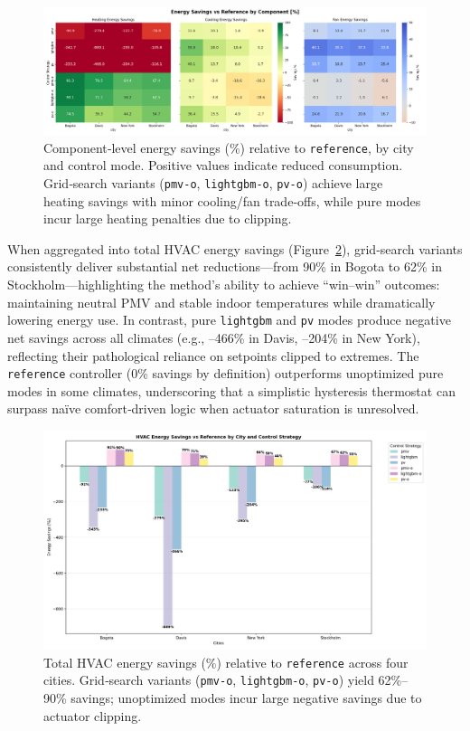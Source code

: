 \begin{figure}[h!]
    \centering
    \includegraphics[width=\linewidth]{figs/saving_end_pct.png}
    \caption{Component‐level energy savings (\%) relative to \texttt{reference}, by city and control mode. Positive values indicate reduced consumption. Grid‐search variants (\texttt{pmv-o}, \texttt{lightgbm-o}, \texttt{pv-o}) achieve large heating savings with minor cooling/fan trade‐offs, while pure modes incur large heating penalties due to clipping.}
    \label{fig:component_savings}
\end{figure}

When aggregated into total HVAC energy savings (Figure~\ref{fig:hvac_savings}), grid‐search variants consistently deliver substantial net reductions—from 90\% in Bogota to 62\% in Stockholm—highlighting the method’s ability to achieve “win–win” outcomes: maintaining neutral PMV and stable indoor temperatures while dramatically lowering energy use. In contrast, pure \texttt{lightgbm} and \texttt{pv} modes produce negative net savings across all climates (e.g., –466\% in Davis, –204\% in New York), reflecting their pathological reliance on setpoints clipped to extremes. The \texttt{reference} controller (0\% savings by definition) outperforms unoptimized pure modes in some climates, underscoring that a simplistic hysteresis thermostat can surpass naïve comfort‐driven logic when actuator saturation is unresolved.

\begin{figure}[h!]
    \centering
    \includegraphics[width=\linewidth]{figs/savings_r.png}
    \caption{Total HVAC energy savings (\%) relative to \texttt{reference} across four cities. Grid‐search variants (\texttt{pmv-o}, \texttt{lightgbm-o}, \texttt{pv-o}) yield 62\%–90\% savings; unoptimized modes incur large negative savings due to actuator clipping.}
    \label{fig:hvac_savings}
\end{figure}


